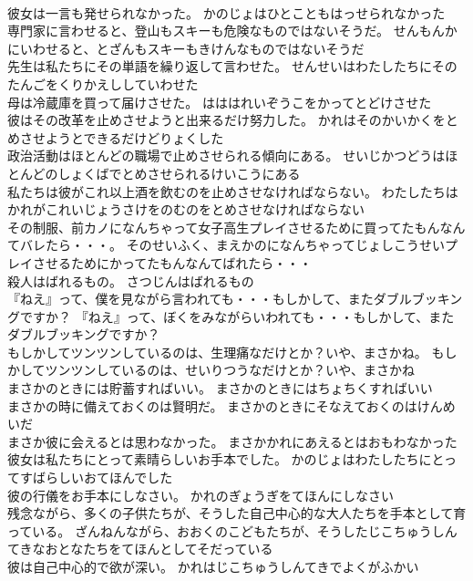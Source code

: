\documentclass[8pt]{extreport}
\begin{document}
\begin{CJK}{UTF8}{min}
\\	彼女は一言も発せられなかった。	かのじょはひとこともはっせられなかった 
\\	専門家に言わせると、登山もスキーも危険なものではないそうだ。	せんもんかにいわせると、とざんもスキーもきけんなものではないそうだ 
\\	先生は私たちにその単語を繰り返して言わせた。	せんせいはわたしたちにそのたんごをくりかえししていわせた 
\\	母は冷蔵庫を買って届けさせた。	はははれいぞうこをかってとどけさせた 
\\	彼はその改革を止めさせようと出来るだけ努力した。	かれはそのかいかくをとめさせようとできるだけどりょくした 
\\	政治活動はほとんどの職場で止めさせられる傾向にある。	せいじかつどうはほとんどのしょくばでとめさせられるけいこうにある 
\\	私たちは彼がこれ以上酒を飲むのを止めさせなければならない。	わたしたちはかれがこれいじょうさけをのむのをとめさせなければならない 
\\	その制服、前カノになんちゃって女子高生プレイさせるために買ってたもんなんてバレたら・・・。	そのせいふく、まえかのになんちゃってじょしこうせいプレイさせるためにかってたもんなんてばれたら・・・ 
\\	殺人はばれるもの。	さつじんはばれるもの 
\\	『ねえ』って、僕を見ながら言われても・・・もしかして、またダブルブッキングですか？	『ねえ』って、ぼくをみながらいわれても・・・もしかして、またダブルブッキングですか？ 
\\	もしかしてツンツンしているのは、生理痛なだけとか？いや、まさかね。	もしかしてツンツンしているのは、せいりつうなだけとか？いや、まさかね 
\\	まさかのときには貯蓄すればいい。	まさかのときにはちょちくすればいい 
\\	まさかの時に備えておくのは賢明だ。	まさかのときにそなえておくのはけんめいだ 
\\	まさか彼に会えるとは思わなかった。	まさかかれにあえるとはおもわなかった 
\\	彼女は私たちにとって素晴らしいお手本でした。	かのじょはわたしたちにとってすばらしいおてほんでした 
\\	彼の行儀をお手本にしなさい。	かれのぎょうぎをてほんにしなさい 
\\	残念ながら、多くの子供たちが、そうした自己中心的な大人たちを手本として育っている。	ざんねんながら、おおくのこどもたちが、そうしたじこちゅうしんてきなおとなたちをてほんとしてそだっている 
\\	彼は自己中心的で欲が深い。	かれはじこちゅうしんてきでよくがふかい 

\end{CJK}
\end{document}
